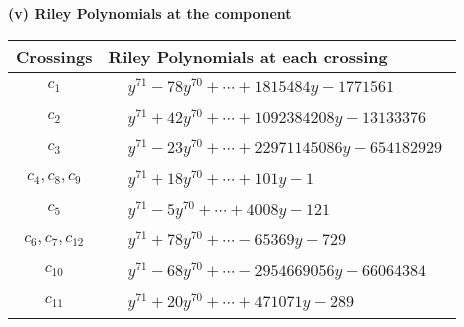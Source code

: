 \documentclass[1p]{elsarticle_modified}
\theoremstyle{definition}
\begin{document}
\newpage\renewcommand{\arraystretch}{1}
\flushleft \textbf{(v) Riley Polynomials at the component}\newline \\
\begin{tabular}{m{50pt}|m{274pt}}
Crossings & \hspace{64pt}Riley Polynomials at each crossing \\
\hline $$\begin{aligned}c_{1}\end{aligned}$$&$\begin{aligned}
&y^{71}-78 y^{70}+\cdots+1815484 y-1771561
\end{aligned}$\\
\hline $$\begin{aligned}c_{2}\end{aligned}$$&$\begin{aligned}
&y^{71}+42 y^{70}+\cdots+1092384208 y-13133376
\end{aligned}$\\
\hline $$\begin{aligned}c_{3}\end{aligned}$$&$\begin{aligned}
&y^{71}-23 y^{70}+\cdots+22971145086 y-654182929
\end{aligned}$\\
\hline $$\begin{aligned}c_{4},c_{8},c_{9}\end{aligned}$$&$\begin{aligned}
&y^{71}+18 y^{70}+\cdots+101 y-1
\end{aligned}$\\
\hline $$\begin{aligned}c_{5}\end{aligned}$$&$\begin{aligned}
&y^{71}-5 y^{70}+\cdots+4008 y-121
\end{aligned}$\\
\hline $$\begin{aligned}c_{6},c_{7},c_{12}\end{aligned}$$&$\begin{aligned}
&y^{71}+78 y^{70}+\cdots-65369 y-729
\end{aligned}$\\
\hline $$\begin{aligned}c_{10}\end{aligned}$$&$\begin{aligned}
&y^{71}-68 y^{70}+\cdots-2954669056 y-66064384
\end{aligned}$\\
\hline $$\begin{aligned}c_{11}\end{aligned}$$&$\begin{aligned}
&y^{71}+20 y^{70}+\cdots+471071 y-289
\end{aligned}$\\
\hline
\end{tabular}\\~\\
\end{document}
